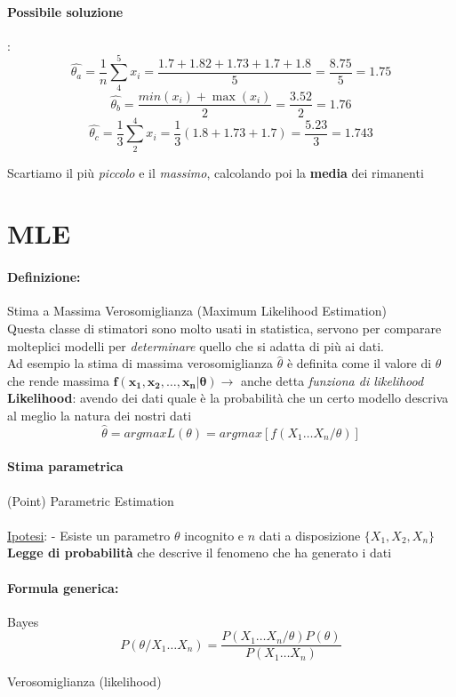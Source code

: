 \documentclass[]{article}
\newcommand{\definizione}{\paragraph{Definizione:}}
\newcommand{\formula}{\paragraph{Formula generica:}}
\begin{document}
    \paragraph{Possibile soluzione}: 
    \[ \hat{\theta_a} = \frac{1}{n} \sum_{4}^{5} x_i = \frac{1.7 + 1.82 + 1.73 + 1.7 + 1.8}{5} = \frac{8.75}{5} = 1.75 \]
    \[ \hat{\theta_b} = \frac{min(x_i) + \max(x_i)}{2} = \frac{3.52}{2} = 1.76 \]
    \[ \hat{\theta_c} = \frac{1}{3} \sum_{2}^{4} x_i = \frac{1}{3} (1.8 + 1.73 + 1.7) = \frac{5.23}{3} = 1.743 \]
    \centerline{Scartiamo il più \textit{piccolo} e il \textit{massimo}, calcolando poi la \textbf{media} dei rimanenti}
    \section{MLE}
    \definizione Stima a Massima Verosomiglianza (Maximum Likelihood Estimation) \\
    Questa classe di stimatori sono molto usati in statistica, servono per comparare molteplici modelli per \textit{determinare} quello che si adatta di più ai dati. \\
    Ad esempio la stima di massima verosomiglianza $\hat{\theta}$ è definita come il valore di $\theta$ che rende massima $\boldsymbol{f(x_1, x_2, \ldots, x_n \rvert \theta)} \rightarrow$ anche detta \textit{funziona di likelihood} \\[2ex]
    \textbf{Likelihood}: avendo dei dati quale è la probabilità che un certo modello descriva al meglio la natura dei nostri dati
    \[ \hat{\theta} = argmax L(\theta) = argmax[f(X_1 \ldots X_n / \theta )] \]
    \paragraph{Stima parametrica}(Point) Parametric Estimation \\ \\
    \underline{Ipotesi}:
    - Esiste un parametro $\theta$ incognito e $n$ dati a disposizione $\{X_1, X_2, X_n\}$ \\
    \textbf{Legge di probabilità} che descrive il fenomeno che ha generato i dati
    \formula Bayes
    \[ P(\theta / X_1 \ldots X_n) = \frac{P(X_1 \ldots X_n / \theta) P(\theta)}{P(X_1 \ldots X_n)} \]
    \centerline{Verosomiglianza (likelihood)}
\end{document}
